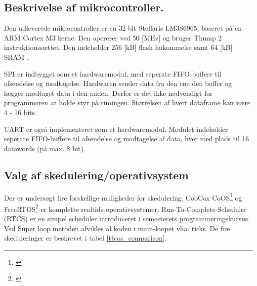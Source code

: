 \subsection{Beskrivelse af mikrocontroller.}
Den udleverede mikrocontroller er en 32 bit Stellaris LM3S6965, baseret på en ARM Cortex M3 kerne. Den opererer ved 50 [MHz] og bruger Thump 2 instruktionssættet. Den indeholder 256 [kB] flash hukommelse samt 64 [kB] SRAM \citep{lm3s6965}.

SPI er indbygget som et hardwaremodul, med seperate FIFO-buffere til afsendelse og modtagelse. Hardwaren sender data fra den ene den buffer og lægger modtaget data i den anden. Derfor er det ikke nødvendigt for programmøren at holde styr på timingen. Størrelsen af hvert dataframe kan være 4 - 16 bits. 

UART er også implementeret som et hardwaremodul. Modulet indeholder seperate FIFO-buffere til afsendelse og modtagelse af data, hver med plads til 16 datawords (på max. 8 bit). 

\subsection{Valg af skedulering/operativsystem}
Der er undersøgt fire forskellige muligheder for skedulering.
CooCox CoOS\footnote{\citep{www.coocox.com/CoOS.htm}} og FreeRTOS\footnote{\citep{freertos.org}}
er komplette realtids-operativsystemer. 
Run-To-Complete-Scheduler (RTCS) er en simpel scheduler introduceret i semesterets programmeringskursus.
Ved Super loop metoden afvikles al koden i main-loopet vha. ticks.
De fire skeduleringer er beskrevet i tabel \ref{tb:os_comparison}.

